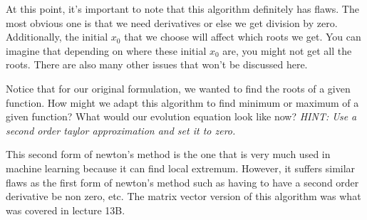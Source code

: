 \begin{enumerate}
    At this point, it's important to note that this algorithm definitely has flaws.
    The most obvious one is that we need derivatives or else we get division by zero.
    Additionally, the initial $x_0$ that we choose will affect which roots we get. 
    You can imagine that depending on where these initial $x_0$ are, you might not get all the roots.
    There are also many other issues that won't be discussed here.

    \qitem 
    Notice that for our original formulation, we wanted to find the roots of a given function.
    How might we adapt this algorithm to find minimum or maximum of a given function?
    What would our evolution equation look like now?
    \emph{HINT: Use a second order taylor approximation and set it to zero.}


    This second form of newton's method is the one that is very much used in machine learning because it can find local extremum.
    However, it suffers similar flaws as the first form of newton's method such as having to have a second order derivative be non zero, etc.
    The matrix vector version of this algorithm was what was covered in lecture 13B.


\end{enumerate}

